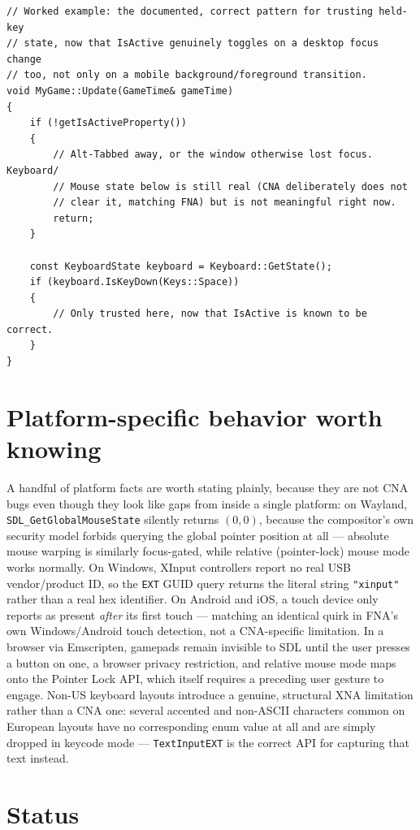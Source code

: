 \begin{lstlisting}
// Worked example: the documented, correct pattern for trusting held-key
// state, now that IsActive genuinely toggles on a desktop focus change
// too, not only on a mobile background/foreground transition.
void MyGame::Update(GameTime& gameTime)
{
    if (!getIsActiveProperty())
    {
        // Alt-Tabbed away, or the window otherwise lost focus. Keyboard/
        // Mouse state below is still real (CNA deliberately does not
        // clear it, matching FNA) but is not meaningful right now.
        return;
    }

    const KeyboardState keyboard = Keyboard::GetState();
    if (keyboard.IsKeyDown(Keys::Space))
    {
        // Only trusted here, now that IsActive is known to be correct.
    }
}
\end{lstlisting}

\section{Platform-specific behavior worth knowing}

A handful of platform facts are worth stating plainly, because they are not CNA bugs even
though they look like gaps from inside a single platform: on Wayland,
\texttt{SDL\_GetGlobalMouseState} silently returns $(0,0)$, because the compositor's own
security model forbids querying the global pointer position at all --- absolute mouse
warping is similarly focus-gated, while relative (pointer-lock) mouse mode works normally.
On Windows, XInput controllers report no real USB vendor/product ID, so the \texttt{EXT}
GUID query returns the literal string \texttt{"xinput"} rather than a real hex identifier.
On Android and iOS, a touch device only reports as present \emph{after} its first touch ---
matching an identical quirk in FNA's own Windows/Android touch detection, not a CNA-specific
limitation. In a browser via Emscripten, gamepads remain invisible to SDL until the user
presses a button on one, a browser privacy restriction, and relative mouse mode maps onto the
Pointer Lock API, which itself requires a preceding user gesture to engage. Non-US keyboard
layouts introduce a genuine, structural XNA limitation rather than a CNA one: several
accented and non-ASCII characters common on European layouts have no corresponding
 enum value at all and are simply dropped in keycode mode --- \texttt{TextInputEXT}
is the correct API for capturing that text instead.

\section{Status}

